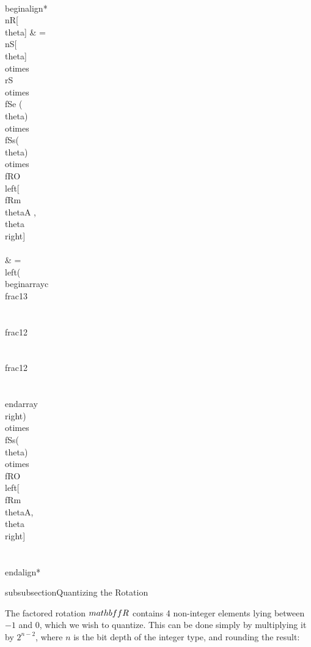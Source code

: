 \\begin{align*}
\\nR[\\theta] & = \\nS[\\theta] \\otimes \\rS \\otimes \\fSe (\\theta) \\otimes \\fSs(\\theta) \\otimes\\fRO \\left[  \\fRm{ \\thetaA }, \\theta \\right] \\\\
& = \\left(
\\begin{array}{c}
 \\frac{1}{3}  \\\\
 \\frac{1}{2}\\\\
 \\frac{1}{2} \\\\
\\end{array}
\\right) \\otimes \\fSs(\\theta) \\otimes\\fRO \\left[  \\fRm{\\thetaA}, \\theta \\right] \\\\
\\end{align*}

subsubsection{Quantizing the Rotation}

The factored rotation $\\mathbf{fR}$ contains 4 non-integer elements lying between $-1$ and $0$, which we wish to quantize. This can be done simply by multiplying it by $2^{n - 2}$, where $n$ is the bit depth of the integer type, and rounding the result: 

